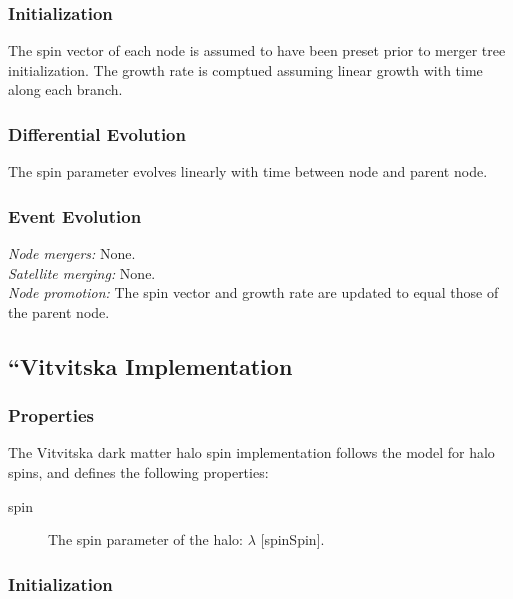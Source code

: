 \subsubsection{Initialization}

The spin vector of each \gls{node} is assumed to have been preset prior to merger tree initialization. The growth rate is comptued assuming linear growth with time along each branch.

\subsubsection{Differential Evolution}

The spin parameter evolves linearly with time between \gls{node} and parent node.

\subsubsection{Event Evolution}

\noindent\emph{Node mergers:} None.\\

\noindent\emph{Satellite merging:} None.\\

\noindent\emph{Node promotion:} The spin vector and growth rate are updated to equal those of the parent node.\\

\subsection{``Vitvitska Implementation}

\subsubsection{Properties}

The Vitvitska dark matter halo spin implementation follows the \cite{vitvitska_origin_2002} model for halo spins, and defines the following properties:
\begin{description}
 \item [{\normalfont \ttfamily spin}] The spin parameter of the halo: $\lambda$ [{\normalfont \ttfamily spinSpin}].
\end{description}

\subsubsection{Initialization}

